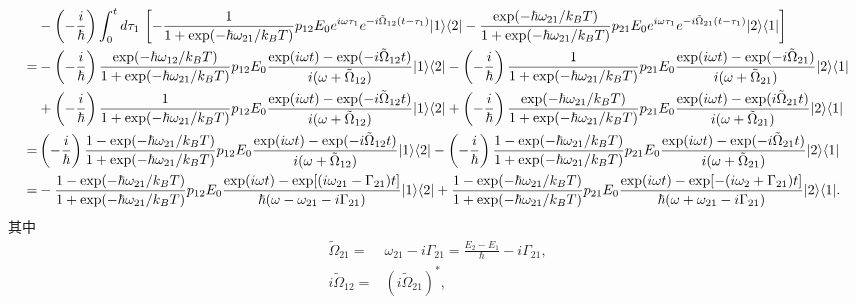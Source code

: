 \documentclass{assignment}
\begin{document}
\begin{align}
    \notag&-\left(-\frac{i}{\hbar}\right)\int_0^td\tau_1\,\left[-\frac{1}{1+\exp(-\hbar\omega_{21}/k_BT)}p_{12}E_0e^{i\omega\tau_1}e^{-i\tilde{\Omega}_{12}(t-\tau_1)}\lvert 1\rangle\langle 2\rvert-\frac{\exp(-\hbar\omega_{21}/k_BT)}{1+\exp(-\hbar\omega_{21}/k_BT)}p_{21}E_0e^{i\omega\tau_1}e^{-i\tilde{\Omega}_{21}(t-\tau_1)}\lvert 2\rangle\langle 1\rvert\right]\\
    \notag=&-\left(-\frac{i}{\hbar}\right)\frac{\exp(-\hbar\omega_{12}/k_BT)}{1+\exp(-\hbar\omega_{21}/k_BT)}p_{12}E_0\frac{\exp(i\omega t)-\exp(-i\tilde{\Omega}_{12}t)}{i(\omega+\tilde{\Omega}_{12})}\lvert 1\rangle\langle 2\rvert-\left(-\frac{i}{\hbar}\right)\frac{1}{1+\exp(-\hbar\omega_{21}/k_BT)}p_{21}E_0\frac{\exp(i\omega t)-\exp(-i\tilde{\Omega}_{21})}{i(\omega+\tilde{\Omega}_{21})}\lvert 2\rangle\langle 1\rvert\\
    \notag&+\left(-\frac{i}{\hbar}\right)\frac{1}{1+\exp(-\hbar\omega_{21}/k_BT)}p_{12}E_0\frac{\exp(i\omega t)-\exp(-i\tilde{\Omega}_{12}t)}{i(\omega+\tilde{\Omega}_{12})}\lvert 1\rangle\langle 2\rvert+\left(-\frac{i}{\hbar}\right)\frac{\exp(-\hbar\omega_{21}/k_BT)}{1+\exp(-\hbar\omega_{21}/k_BT)}p_{21}E_0\frac{\exp(i\omega t)-\exp(i\tilde{\Omega}_{21}t)}{i(\omega+\tilde{\Omega}_{21})}\lvert 2\rangle\langle 1\rvert\\
    \notag=&\left(-\frac{i}{\hbar}\right)\frac{1-\exp(-\hbar\omega_{21}/k_BT)}{1+\exp(-\hbar\omega_{21}/k_BT)}p_{12}E_0\frac{\exp(i\omega t)-\exp(-i\tilde{\Omega}_{12}t)}{i(\omega+\tilde{\Omega}_{12})}\lvert 1\rangle\langle 2\rvert-\left(-\frac{i}{\hbar}\right)\frac{1-\exp(-\hbar\omega_{21}/k_BT)}{1+\exp(-\hbar\omega_{21}/k_BT)}p_{21}E_0\frac{\exp(i\omega t)-\exp(-i\tilde{\Omega}_{21}t)}{i(\omega+\tilde{\Omega}_{21})}\lvert 2\rangle\langle 1\rvert\\
    =&-\frac{1-\exp(-\hbar\omega_{21}/k_BT)}{1+\exp(-\hbar\omega_{21}/k_BT)}p_{12}E_0\frac{\exp(i\omega t)-\exp[(i\omega_{21}-\Gamma_{21})t]}{\hbar(\omega-\omega_{21}-i\Gamma_{21})}\lvert 1\rangle\langle 2\rvert+\frac{1-\exp(-\hbar\omega_{21}/k_BT)}{1+\exp(-\hbar\omega_{21}/k_BT)}p_{21}E_0\frac{\exp(i\omega t)-\exp[-(i\omega_{2}+\Gamma_{21})t]}{\hbar(\omega+\omega_{21}-i\Gamma_{21})}\lvert 2\rangle\langle 1\rvert.
\end{align}
\normalsize
其中
\begin{align}
    \tilde{\Omega}_{21}=&\omega_{21}-i\Gamma_{21}=\frac{E_2-E_1}{\hbar}-i\Gamma_{21},\\
    i\tilde{\Omega}_{12}=&\left(i\tilde{\Omega}_{21}\right)^*,
\end{align}
\end{document}
